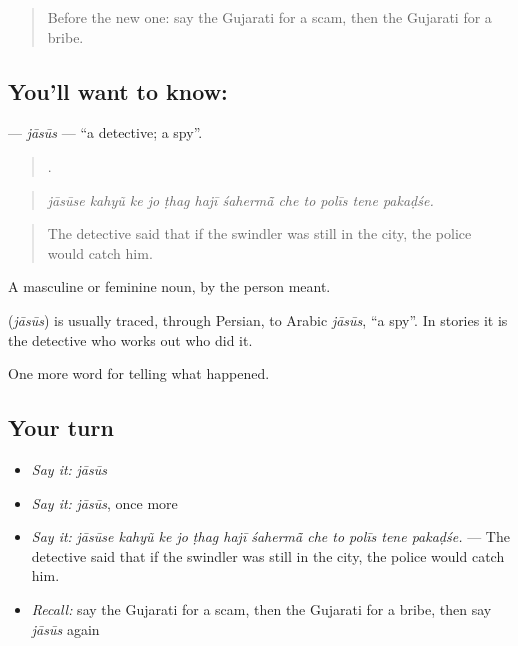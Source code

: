 \label{lesson:GU-C292-jasus}



\begin{quote}
Before the new one: say the Gujarati for a scam, then the Gujarati for a bribe.
\end{quote}

\subsection*{You'll want to know: }
\textbf{} — \emph{jāsūs} — \textquotedblleft{}a detective; a spy\textquotedblright{}.

\begin{quote}
           .
\end{quote}

\begin{quote}
\emph{jāsūse kahyũ ke jo ṭhag hajī śahermā̃ che to polīs tene pakaḍśe.}
\end{quote}

\begin{quote}
The detective said that if the swindler was still in the city, the police would catch him.
\end{quote}

A masculine or feminine noun, by the person meant.

\begin{cousinweb}
\textbf{} (\emph{jāsūs}) is usually traced, through Persian, to Arabic \emph{jāsūs}, \textquotedblleft{}a spy\textquotedblright{}. In stories it is the detective who works out who did it.
\end{cousinweb}

\begin{grammarlens}[title={What you've built}]
One more word for telling what happened.
\end{grammarlens}

\subsection*{Your turn}
\begin{itemize}
\raggedright
  \item \emph{Say it:} \emph{jāsūs}
  \item \emph{Say it:} \emph{jāsūs}, once more
  \item \emph{Say it:} \emph{jāsūse kahyũ ke jo ṭhag hajī śahermā̃ che to polīs tene pakaḍśe.} — The detective said that if the swindler was still in the city, the police would catch him.
  \item \emph{Recall:} say the Gujarati for a scam, then the Gujarati for a bribe, then say \emph{jāsūs} again
\end{itemize}

